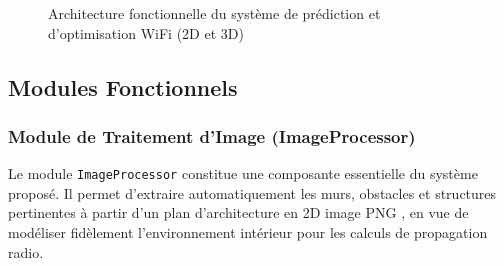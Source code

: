 \documentclass[12pt,a4paper]{article}
\begin{document}
\begin{figure}[H]
{
    }
    \caption{Architecture fonctionnelle du système de prédiction et d'optimisation WiFi (2D et 3D)}
\end{figure}





\subsection{Modules Fonctionnels}

\subsubsection{Module de Traitement d’Image (ImageProcessor)}

Le module \texttt{ImageProcessor} constitue une composante essentielle du système proposé. Il permet d’extraire automatiquement les murs, obstacles et structures pertinentes à partir d’un plan d’architecture en 2D image PNG , en vue de modéliser fidèlement l’environnement intérieur pour les calculs de propagation radio.
\end{document}
